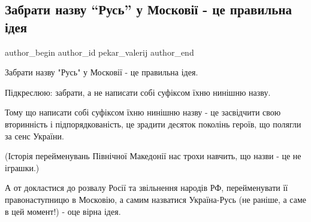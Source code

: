  
 
 
 
 
 
\subsection{Забрати назву \enquote{Русь} у Московії - це правильна ідея}
\label{sec:06_09_2021.fb.pekar_valerij.1.rusj_moskovia}
 
\ifcmt
 author_begin
   author_id pekar_valerij
 author_end
\fi

Забрати назву "Русь" у Московії  -  це правильна ідея. 

Підкреслюю: забрати, а не написати собі суфіксом їхню нинішню назву. 

Тому що написати собі суфіксом їхню нинішню назву  -  це засвідчити свою
вторинність і підпорядкованість, це зрадити десяток поколінь героїв, що полягли
за сенс України. 

(Історія перейменувань Північної Македонії нас трохи навчить, що назви  -  це
не іграшки.)

А от докластися до розвалу Росії та звільнення народів РФ, перейменувати її
правонаступницю в Московію, а самим назватися Україна-Русь (не раніше, а саме в
цей момент!)  -  оце вірна ідея.

